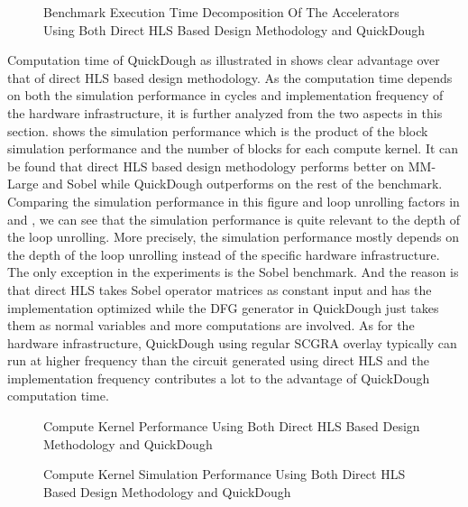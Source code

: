 \begin{figure*}[htpb]
\caption{Benchmark Execution Time Decomposition Of The Accelerators Using Both Direct HLS Based Design Methodology and QuickDough}
\label{fig:execution-time}
\end{figure*}

Computation time of QuickDough as illustrated in  shows clear advantage over that of direct HLS based design methodology. As the computation time depends on both the simulation performance in cycles and implementation frequency of the hardware infrastructure, it is further analyzed from the two aspects in this section.  shows the simulation performance which is the product of the block simulation performance and the number of blocks for each compute kernel. It can be found that direct HLS based design methodology performs better on MM-Large and Sobel while QuickDough outperforms on the rest of the benchmark. Comparing the simulation performance in this figure and loop unrolling factors in  and , we can see that the simulation performance is quite relevant to the depth of the loop unrolling. More precisely, the simulation performance mostly depends on the depth of the loop unrolling instead of the specific hardware infrastructure. The only exception in the experiments is the Sobel benchmark. And the reason is that direct HLS takes Sobel operator matrices as constant input and has the implementation optimized while the DFG generator in QuickDough just takes them as normal variables and more computations are involved. As for the hardware infrastructure, QuickDough using regular SCGRA overlay typically can run at higher frequency than the circuit generated using direct HLS and the implementation frequency contributes a lot to the advantage of QuickDough computation time. 

\begin{figure*}[htpb]
\caption{Compute Kernel Performance Using Both Direct HLS Based Design Methodology and QuickDough}
\label{fig:kernel-real-perf}
\end{figure*}

\begin{figure*}[htpb]
\caption{Compute Kernel Simulation Performance Using Both Direct HLS Based Design Methodology and QuickDough}
\label{fig:kernel-sim-perf}
\end{figure*}

